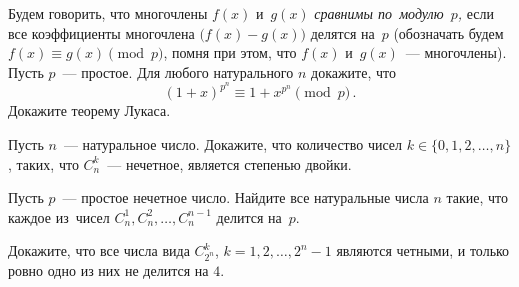 \begin{problems}

\item
Будем говорить, что многочлены $f(x)$ и~$g(x)$ \emph{сравнимы по~модулю~$p$,}
если все коэффициенты многочлена $\bigl(f(x) - g(x)\bigr)$ делятся на~$p$
(обозначать будем $f(x) \equiv g(x) \pmod{p}$, помня при этом, что $f(x)$
и~$g(x)$~--- многочлены).
\\
\subproblem
Пусть $p$~--- простое.
Для любого натурального $n$ докажите, что
\[
    (1 + x)^{p^n} \equiv 1 + x^{p^n} \pmod{p}
\, . \]
\subproblem
Докажите теорему Лукаса.
	
\item
Пусть $n$~--- натуральное число.
Докажите, что количество чисел $k \in \{0, 1, 2, \ldots, n\}$, таких, что
$C_n^k$~--- нечетное, является степенью двойки.

\item
Пусть $p$~--- простое нечетное число.
Найдите все натуральные числа $n$ такие, что каждое из~чисел
$C_n^1, C_n^2, \ldots, C_n^{n-1}$ делится на~$p$.

\item
Докажите, что все числа вида $C_{2^n}^k$, $k = 1, 2, \ldots, 2^n - 1$ являются
четными, и только ровно одно из них не делится на $4$.

\end{problems}

\endgroup %

